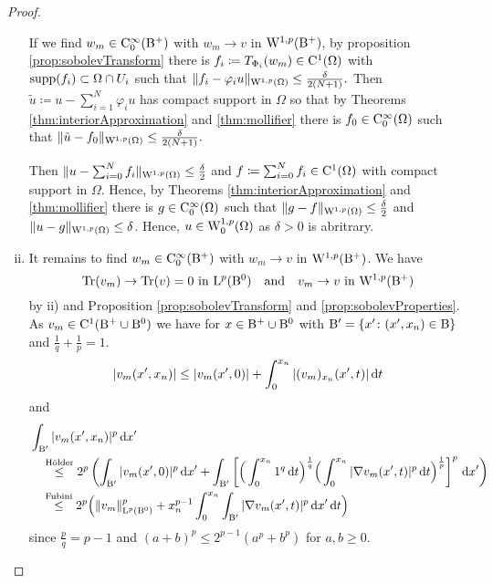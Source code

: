 \begin{proof}
\begin{enumerate}[i)]
    If we find $w_m \in \mathrm{C}_0^\infty(\mathrm{B}^+)$ with $w_m \to v$ in $\mathrm{W}^{1,p}(\mathrm{B}^+)$, by proposition \ref{prop:sobolevTransform} there is $f_i \coloneqq T_{\Phi_i}(w_m) \in \mathrm{C}^1(\Omega)$ with $\operatorname{supp}(f_i) \subset \Omega \cap U_i$ such that 
    $\|f_i - \varphi_i u\|_{\mathrm{W}^{1,p}(\Omega)} \leq \frac{\delta}{2(N + 1)}.$
    Then $\tilde u \coloneqq u - \sum_{i = 1}^N \varphi_i u$ has compact support in $\Omega$ so that by Theorems \ref{thm:interiorApproximation} and \ref{thm:mollifier} there is $f_0 \in \mathrm{C}_0^\infty(\Omega)$ such that 
    $\| \tilde u - f_0 \|_{\mathrm{W}^{1,p}(\Omega)} \leq \frac{\delta}{2(N + 1)}.$

    Then $\| u - \sum_{i = 0}^N f_i \|_{\mathrm{W}^{1,p}(\Omega)} \leq \frac{\delta}{2}$ and $f \coloneqq \sum_{i = 0}^N f_i \in \mathrm{C}^1(\Omega)$ with compact support in $\Omega$.
    Hence, by Theorems \ref{thm:interiorApproximation} and \ref{thm:mollifier} there is $g \in \mathrm{C}_0^\infty(\Omega)$ such that $\|g - f\|_{\mathrm{W}^{1,p}(\Omega)} \leq \frac{\delta}{2}$ and $\|u - g\|_{\mathrm{W}^{1,p}(\Omega)} \leq \delta$.
    Hence, $u \in \mathrm{W}_0^{1,p}(\Omega)$ as $\delta > 0$ is abritrary.

  \item It remains to find $w_m \in \mathrm{C}_0^\infty(\mathrm{B}^+)$ with $w_m \to v$ in $\mathrm{W}^{1,p}(\mathrm{B}^+)$.
    We have
    \begin{equation}
      \label{eq:traceAndSobolevConv}
      \operatorname{Tr}(v_m) \to \operatorname{Tr}(v) = 0 \text{ in } \mathrm{L}^p(\mathrm{B}^0) 
      \quad\text{and}\quad
      v_m \to v \text{ in } \mathrm{W}^{1,p}(\mathrm{B}^+)
    \end{equation}
    by ii) and Proposition \ref{prop:sobolevTransform} and \ref{prop:sobolevProperties}.
    As $v_m \in \mathrm{C}^1(\mathrm{B}^+ \cup \mathrm{B}^0)$ we have for $x \in \mathrm{B}^+ \cup \mathrm{B}^0$ with $\mathrm{B}' = \{x' \colon (x', x_n) \in \mathrm{B}\}$ and $\frac{1}{q} + \frac{1}{p} = 1$.
    $$
    |v_m(x', x_n)|
    \leq |v_m(x',0)| + \int_0^{x_n} |(v_m)_{x_n} (x', t)| \, {\operatorname{d}\!{t}}
    $$
    and
    \begin{align*}
      &\int_{\mathrm{B}'} |v_m(x', x_n)|^p \, {\operatorname{d}\!{x}}' \\
      &\quad\overset{\text{Hölder}}{\leq} 2^p \left( \int_{\mathrm{B}'} |v_m(x',0)|^p \, {\operatorname{d}\!{x}}' + \int_{\mathrm{B}'} \left[ \Big(\int_0^{x_n} 1^q \, {\operatorname{d}\!{t}}\Big)^{\frac{1}{q}} \Big( \int_0^{x_n} |\nabla v_m(x',t)|^p \, {\operatorname{d}\!{t}} \Big)^{\frac{1}{p}} \right]^p \, {\operatorname{d}\!{x}}' \right) \\
      &\quad\overset{\text{Fubini}}{\leq} 2^p \Big( \|v_m\|_{\mathrm{L}^p(\mathrm{B}^0)}^p + x_n^{p - 1} \int_0^{x_n} \int_{\mathrm{B}'} | \nabla v_m(x',t)|^p \, {\operatorname{d}\!{x}}' \, {\operatorname{d}\!{t}} \Big)
    \end{align*}
    since $\frac{p}{q} = p - 1$ and $(a + b)^p \leq 2^{p - 1}(a^p + b^p)$ for $a,b \geq 0$.


\end{enumerate}
\end{proof}
